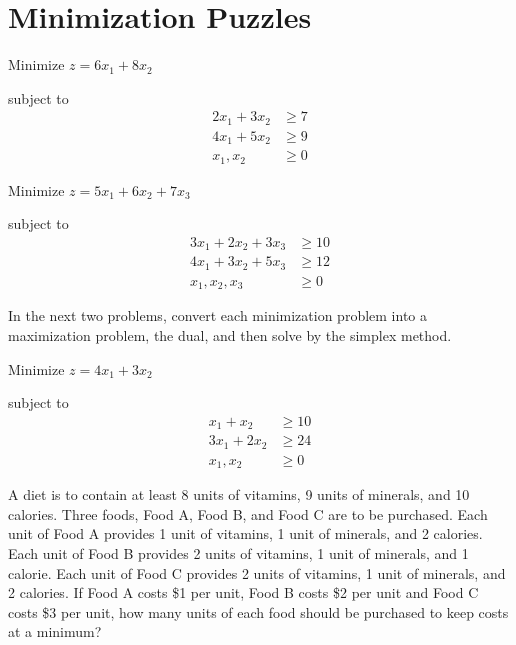 \section{Minimization Puzzles}

\begin{puzzle}
    Minimize \( z = 6x_1 + 8x_2 \)

    subject to
    \begin{align*}
        2x_1 + 3x_2 & \geq 7 \\
        4x_1 + 5x_2 & \geq 9 \\
        x_1, x_2    & \geq 0
    \end{align*}
\end{puzzle}

\begin{puzzle}
    Minimize \( z = 5x_1 + 6x_2 + 7x_3 \)

    subject to
    \begin{align*}
        3x_1 + 2x_2 + 3x_3 & \geq 10 \\
        4x_1 + 3x_2 + 5x_3 & \geq 12 \\
        x_1, x_2, x_3      & \geq 0
    \end{align*}
\end{puzzle}

\begin{puzzle}
    In the next two problems, convert each minimization problem into a maximization problem, the dual, and then solve by the simplex method.

    Minimize \( z = 4x_1 + 3x_2 \)

    subject to
    \begin{align*}
        x_1 + x_2   & \geq 10 \\
        3x_1 + 2x_2 & \geq 24 \\
        x_1, x_2    & \geq 0
    \end{align*}
\end{puzzle}

\begin{puzzle}
    A diet is to contain at least 8 units of vitamins, 9 units of minerals, and 10 calories. Three foods, Food A, Food B, and Food C are to be purchased. Each unit of Food A provides 1 unit of vitamins, 1 unit of minerals, and 2 calories. Each unit of Food B provides 2 units of vitamins, 1 unit of minerals, and 1 calorie. Each unit of Food C provides 2 units of vitamins, 1 unit of minerals, and 2 calories. If Food A costs \$1 per unit, Food B costs \$2 per unit and Food C costs \$3 per unit, how many units of each food should be purchased to keep costs at a minimum?
\end{puzzle}

